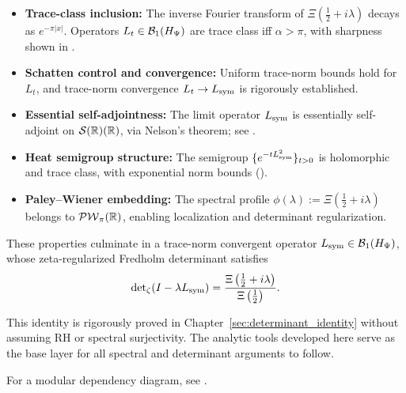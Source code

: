 \begin{itemize}
    \item \textbf{Trace-class inclusion:} The inverse Fourier transform of \( \Xi(\tfrac{1}{2} + i\lambda) \) decays as \( e^{-\pi|x|} \). Operators \( L_t \in \mathcal{B}_1(H_{\Psi}) \) are trace class iff \( \alpha > \pi \), with sharpness shown in .
    
    \item \textbf{Schatten control and convergence:} Uniform trace-norm bounds hold for \( L_t \), and trace-norm convergence \( L_t \to L_{\mathrm{sym}} \) is rigorously established.
    
    \item \textbf{Essential self-adjointness:} The limit operator \( L_{\mathrm{sym}} \) is essentially self-adjoint on \( \mathcal{S}(\mathbb{R})(\mathbb{R}) \), via Nelson's theorem; see .
    
    \item \textbf{Heat semigroup structure:} The semigroup \( \{e^{-t L_{\mathrm{sym}}^2}\}_{t > 0} \) is holomorphic and trace class, with exponential norm bounds ().
    
    \item \textbf{Paley–Wiener embedding:} The spectral profile \( \phi(\lambda) := \Xi(\tfrac{1}{2} + i\lambda) \) belongs to \( \mathcal{PW}_{\pi}(\mathbb{R}) \), enabling localization and determinant regularization.
\end{itemize}

These properties culminate in a trace-norm convergent operator \( L_{\mathrm{sym}} \in \mathcal{B}_1(H_{\Psi}) \), whose zeta-regularized Fredholm determinant satisfies
\[
\det\nolimits_\zeta(I - \lambda L_{\mathrm{sym}}) = \frac{\Xi\left(\tfrac{1}{2} + i\lambda\right)}{\Xi\left(\tfrac{1}{2}\right)}.
\]

This identity is rigorously proved in Chapter~\ref{sec:determinant_identity} without assuming RH or spectral surjectivity. The analytic tools developed here serve as the base layer for all spectral and determinant arguments to follow.

For a modular dependency diagram, see .
